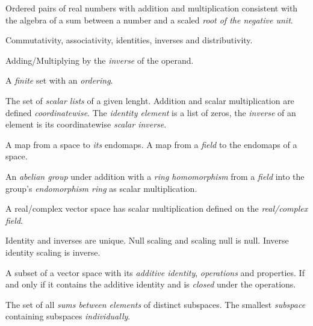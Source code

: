 \pagebreak


\begin{multicols}{3}

  Ordered pairs of real numbers with addition and multiplication consistent with
  the algebra of a sum between a number and a scaled \textit{root of the negative unit}.

  Commutativity, associativity, identities, inverses and distributivity.

  Adding/Multiplying by the \textit{inverse} of the operand.

  A \textit{finite} set with an \textit{ordering}.

  The set of \textit{scalar lists} of a given lenght.
  Addition and scalar multiplication are defined \textit{coordinatewise}.
  The \textit{identity element} is a list of zeros, the \textit{inverse}
  of an element is its coordinatewise \textit{scalar inverse}.

  A map from a space to \textit{its} endomaps.
  A map from a \textit{field} to the endomaps of a space.

  An \textit{abelian group} under addition with a \textit{ring homomorphism} from a \textit{field} into the group's \textit{endomorphism ring} as scalar multiplication.

  A real/complex vector space has scalar multiplication defined on the \textit{real/complex field}.

  Identity and inverses are unique. Null scaling and scaling null is null. Inverse identity scaling is inverse.

  A subset of a vector space with its \textit{additive identity}, \textit{operations} and properties.
  If and only if it contains the additive identity and is \textit{closed} under the operations.

  The set of all \textit{sums between elements} of distinct subspaces.
  The smallest \textit{subspace} containing subspaces \textit{individually}.


\end{multicols}
